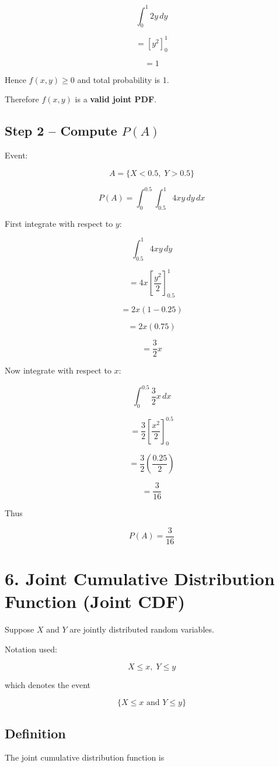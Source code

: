 \documentclass[12pt]{article}
\begin{document}
\[
\int_0^1 2y\,dy
\]

\[
=\left[y^2\right]_0^1
\]

\[
=1
\]

Hence $f(x,y) \ge 0$ and total probability is 1.

Therefore $f(x,y)$ is a \textbf{valid joint PDF}.

\subsection*{Step 2 -- Compute $P(A)$}

Event:

\[
A = \{X < 0.5,\; Y > 0.5\}
\]

\[
P(A)=\int_0^{0.5} \int_{0.5}^1 4xy\,dy\,dx
\]

First integrate with respect to $y$:

\[
\int_{0.5}^{1} 4xy\,dy
\]

\[
=4x\left[\frac{y^2}{2}\right]_{0.5}^{1}
\]

\[
=2x(1-0.25)
\]

\[
=2x(0.75)
\]

\[
=\frac{3}{2}x
\]

Now integrate with respect to $x$:

\[
\int_0^{0.5} \frac{3}{2}x\,dx
\]

\[
=\frac{3}{2}\left[\frac{x^2}{2}\right]_0^{0.5}
\]

\[
=\frac{3}{2}\left(\frac{0.25}{2}\right)
\]

\[
=\frac{3}{16}
\]

Thus

\[
P(A)=\frac{3}{16}
\]

\section*{6. Joint Cumulative Distribution Function (Joint CDF)}

Suppose $X$ and $Y$ are jointly distributed random variables.

Notation used:

\[
X \le x,\; Y \le y
\]

which denotes the event

\[
\{X \le x \text{ and } Y \le y\}
\]

\subsection*{Definition}

The joint cumulative distribution function is
\end{document}
